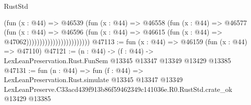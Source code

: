 \begin{lexlean}{RustStd}
\begin{coremodule}
                                        (fun (x : @44) =>
                                        @46539
                                          (fun (x : @44) =>
                                          @46558
                                            (fun (x : @44) =>
                                            @46577
                                              (fun (x : @44) =>
                                              @46596
                                                (fun (x : @44) =>
                                                @46615
                                                  (fun (x : @44) => @47062))))))))))))))))))))))))
@47113 := fun (x : @44) => @46159 (fun (x : @44) => @47110)
@47121 := (n : @44) ->
  (f : @44) -> LexLeanPreservation.Rust.FunSem @13345 @13347 @13349 @13429 @13385
@47131 := fun (n : @44) =>
  fun (f : @44) =>
  LexLeanPreservation.Rust.simulate
    @13345
    @13347
    @13349
    LexLeanPreserve.C33acd439f913b86f59462349c141036e.R0.RustStd.crate_ok
    @13429
    @13385
\end{coremodule}
\end{lexlean}
